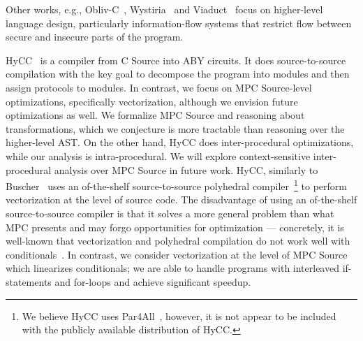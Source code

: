 Other works, e.g., Obliv-C~\cite{Zahur:2015}, Wystiria~\cite{SP:RasHamHic14} and Viaduct~\cite{Acay:2021} focus on higher-level language design, particularly information-flow systems that
restrict flow between secure and insecure parts of the program.


HyCC~\cite{CCS:BDKKS18} is a compiler from C Source into ABY circuits. It does source-to-source compilation with the key goal to decompose the 
program into modules and then assign protocols to modules. In contrast, we focus on MPC Source-level optimizations, specifically vectorization, although we envision 
future optimizations as well. We formalize MPC Source and reasoning about transformations, which we conjecture is more tractable than reasoning over
the higher-level AST. On the other hand, HyCC does inter-procedural optimizations, while our analysis is intra-procedural. We will explore context-sensitive inter-procedural 
analysis over MPC Source in future work. HyCC, similarly to Buscher~\cite{Buscher:2018} uses an of-the-shelf source-to-source polyhedral compiler~\footnote{We believe HyCC uses 
Par4All~, however, it is not appear to be included with the publicly available distribution of HyCC.}
to perform vectorization at the level of source code. The disadvantage of using an of-the-shelf source-to-source compiler is that it solves a more general 
problem than what MPC presents and may forgo opportunities for optimization --- concretely, it is well-known that vectorization and polyhedral compilation 
do not work well with conditionals~\cite{Benabderrahmane:2010,Karrenberg:2015}. In contrast, we consider vectorization at the level of MPC Source which 
linearizes conditionals; we are able to handle programs with interleaved if-statements and for-loops and achieve significant speedup. 
 


